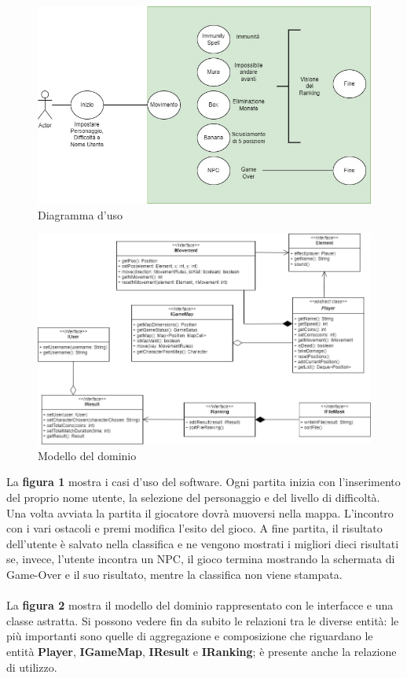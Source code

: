 \documentclass[12pt, letterpaper]{article}
\begin{document}
        \begin{figure}
            \centering
            \includegraphics[width=1\linewidth]{user_case.jpg}
            \caption{Diagramma d'uso}
        \end{figure}
        \begin{figure}
            \centering
            \includegraphics[width=1\linewidth]{model_domain.png}
            \caption{Modello del dominio}
        \end{figure}
        La \textbf{figura 1} mostra i casi d'uso del software. Ogni partita inizia con l'inserimento del proprio nome utente, la selezione del personaggio e del livello di difficoltà. Una volta avviata la partita il giocatore dovrà muoversi nella mappa. L'incontro con i vari ostacoli e premi modifica l'esito del gioco. A fine partita, il risultato dell'utente è salvato nella classifica e ne vengono mostrati i migliori dieci risultati se, invece, l'utente incontra un NPC, il gioco termina mostrando la schermata di Game-Over e il suo risultato, mentre la classifica non viene stampata.
        \\
        \\
        La \textbf{figura 2} mostra il modello del dominio rappresentato con le interfacce e una classe astratta. Si possono vedere fin da subito le relazioni tra le diverse entità: le più importanti sono quelle di aggregazione e composizione che riguardano le entità \textbf{Player}, \textbf{IGameMap}, \textbf{IResult} e \textbf{IRanking}; è presente anche la relazione di utilizzo.
    \newpage
\end{document}
